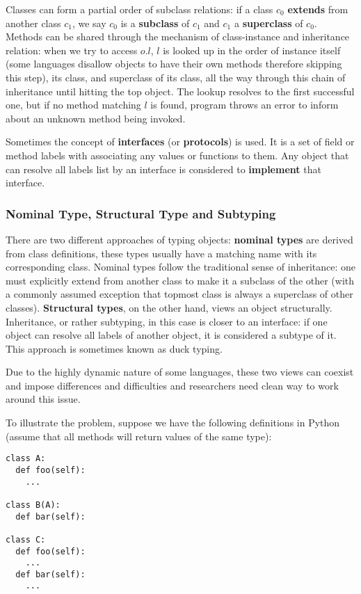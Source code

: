 Classes can form a partial order of subclass relations: if a class $c_0$ \textbf{extends} from
another class $c_1$, we say $c_0$ is a \textbf{subclass} of $c_1$ and $c_1$ a \textbf{superclass} of $c_0$.
Methods can be shared through the mechanism of class-instance and inheritance relation:
when we try to access $o.l$, $l$ is looked up in the order of instance itself (some languages disallow
objects to have their own methods therefore skipping this step), its class, and superclass of its class,
all the way through this chain of inheritance until hitting the top object.
The lookup resolves to the first successful one,
but if no method matching $l$ is found, program throws an error to inform about an unknown method being invoked.

Sometimes the concept of \textbf{interfaces} (or \textbf{protocols}) is used. It is a set of
field or method labels with associating any values or functions to them.
Any object that can resolve all labels list by an interface is considered to
\textbf{implement} that interface.

\subsubsection{Nominal Type, Structural Type and Subtyping}

There are two different approaches of typing objects:
\textbf{nominal types} are derived from class definitions, these types usually have a matching name with its
corresponding class.  Nominal types follow the traditional sense of inheritance:
one must explicitly extend from another class to make it a subclass of the other
(with a commonly assumed exception that topmost class is always a superclass of other classes).
\textbf{Structural types}, on the other hand, views an object structurally.
Inheritance, or rather subtyping, in this case is closer to an interface: if one object can resolve all labels of another object, it is considered a subtype of it. This approach is sometimes known as duck typing.

Due to the highly dynamic nature of some languages, these two views can coexist and
impose differences and difficulties and researchers need clean way to work around this issue.

To illustrate the problem, suppose we have the following definitions in Python
(assume that all methods will return values of the same type):

\begin{verbatim}
class A:
  def foo(self):
    ...

class B(A):
  def bar(self):
  
class C:
  def foo(self):
    ...
  def bar(self):
    ...
\end{verbatim}

